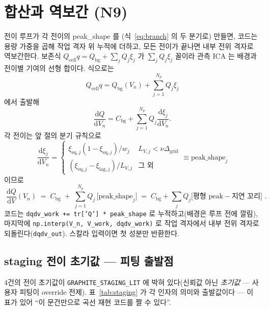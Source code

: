 \documentclass[11pt,a4paper]{article}
\newcommand{\dd}{\mathrm{d}}
\newcommand{\eq}{\mathrm{eq}}
\newcommand{\cell}{\mathrm{cell}}
\newcommand{\bg}{\mathrm{bg}}
\newcommand{\code}[1]{\texttt{#1}}
\begin{document}
\section{합산과 역보간 (N9)}\label{sec:sum}
전이 루프가 각 전이의 peak\_shape 를 (식~\eqref{eq:branch} 의 두 분기로) 만들면, 코드는 용량 가중을 곱해 작업 격자 위
누적에 더하고, 모든 전이가 끝나면 내부 전위 격자로 역보간한다. 보존식 $Q_\cell q=Q_\bg+\sum_jQ_j\xi_j$ 가
$\sum_jQ_j\xi_j$ 꼴이라 관측 ICA 는 배경과 전이별 기여의 선형 합이다. 식으로는
\begin{equation}
Q_\cell q=Q_\bg(V_n)+\sum_{j=1}^{N_p}Q_j\xi_j
\label{eq:sum_depart_v809}
\end{equation}
에서 출발해
\begin{equation}
\frac{\dd Q}{\dd V_n}
=C_\bg+\sum_{j=1}^{N_p}Q_j\frac{\dd\xi_j}{\dd V_n}.
\label{eq:sum_mid_v809}
\end{equation}
각 전이는 앞 절의 분기 규칙으로
\begin{equation}
\frac{\dd\xi_j}{\dd V_n}
=
\begin{cases}
\xi_{\eq,j}(1-\xi_{\eq,j})/w_j & L_{V,j}<\nu\Delta_\mathrm{grid}\\[2pt]
(\xi_{\eq,j}-\xi_{\mathrm{lag},j})/L_{V,j} & \text{그 외}
\end{cases}
\equiv \text{peak\_shape}_j
\label{eq:sum_peakshape_v809}
\end{equation}
이므로
\begin{equation}
\boxed{\;\frac{\dd Q}{\dd V}(V_n)\;=\;C_\bg\;+\;\sum_{j=1}^{N_p}Q_j\,
\big[\text{peak\_shape}_j\big]
\;=\;C_\bg+\sum_jQ_j\big[\text{평형 peak}-\text{지연 꼬리}\big]\;.}
\label{eq:sum}
\end{equation}
코드는 \code{dqdv\_work += tr['Q'] * peak\_shape} 로 누적하고(배경은 루프 전에 깔림), 마지막에
\code{np.interp(V\_n, V\_work, dqdv\_work)} 로 작업 격자에서 내부 전위 격자로 되돌린다(\code{dqdv\_out}).
스칼라 입력이면 첫 성분만 반환한다.

\subsection{staging 전이 초기값 — 피팅 출발점}
4건의 전이 초기값이 \code{GRAPHITE\_STAGING\_LIT} 에 박혀 있다(신뢰값 아닌 \emph{초기값} — 사용자 피팅이 override
전제). 표~\ref{tab:staging} 가 각 인자의 의미와 출발값이다 — 이 표가 있어 ``이 문건만으로 곡선 재현 코드를 짤 수 있다''.
\end{document}
